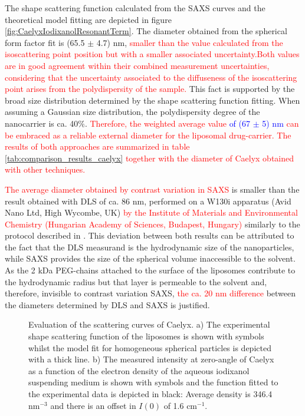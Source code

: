 The shape scattering function calculated from the SAXS curves and the theoretical model fitting are depicted in figure \ref{fig:CaelyxIodixanolResonantTerm}. The diameter obtained from the spherical form factor fit is (65.5 $\pm$ 4.7) nm, \textcolor{red}{smaller than the value calculated from the isoscattering point position but with a smaller associated uncertainty.}\textcolor{red}{Both values are in good agreement within their combined measurement uncertainties, considering that the uncertainty associated to the diffuseness of the isoscattering point arises from the polydispersity of the sample.} This fact is supported by the broad size distribution determined by the shape scattering function fitting. When assuming a Gaussian size distribution, the polydispersity degree of the nanocarrier is ca. 40$\%$. \textcolor{red}{Therefore, the weighted average value \textcolor{blue}{of (67 $\pm$ 5) nm} can be embraced as a reliable \textcolor{red}{external diameter} for the liposomal drug-carrier.} \textcolor{red}{The results of both approaches are summarized in table \ref{tab:comparison_results_caelyx} together with the diameter of Caelyx obtained with other techniques.}

\textcolor{red}{The average diameter obtained by contrast variation in SAXS} is smaller than the result obtained with DLS of ca. 86 nm, performed on a W130i apparatus (Avid Nano Ltd, High Wycombe, UK) \textcolor{red}{by the Institute of Materials and Environmental Chemistry (Hungarian Academy of Sciences, Budapest, Hungary)} similarly to the protocol described in \cite{varga_osmotic_2014}. This deviation between both results can be attributed to the fact that the DLS measurand is the hydrodynamic size of the nanoparticles, while SAXS provides the size of the spherical volume inaccessible to the solvent. As the 2 kDa PEG-chains attached to the surface of the liposomes contribute to the hydrodynamic radius but that layer is permeable to the solvent and, therefore, invisible to contrast variation SAXS, \textcolor{red}{the ca. 20 nm difference} between the diameters determined by DLS and SAXS is justified.



\begin{figure}
	\centering
		\qquad
		\caption[Shape scattering function and zero-angle intensity of Caelyx.]{Evaluation of the scattering curves of Caelyx. a) The experimental shape scattering function of the liposomes is shown with symbols whilst the model fit for homogeneous spherical particles is depicted with a thick line.  b) The measured intensity at zero-angle of Caelyx as a function of the electron density of the aqueous iodixanol suspending medium is shown with symbols and the function fitted to the experimental data is depicted in black: Average density is 346.4 nm$^{-3}$ and there is an offset in $I(0)$ of 1.6 cm$^{-1}$.}
\end{figure}


